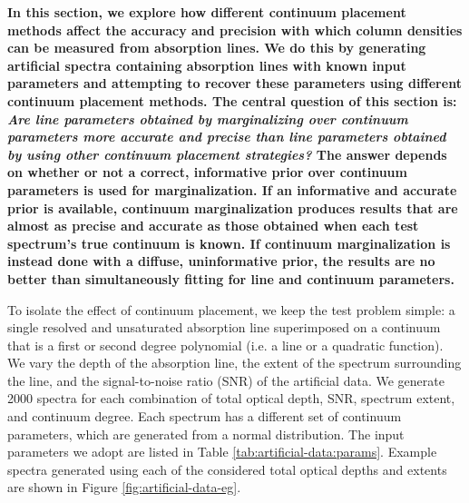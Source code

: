 \documentclass[manuscript]{aastex62}
\begin{document}
{ \bf
In this section, we explore how different continuum placement methods affect the accuracy and precision with which column densities can be measured from absorption lines.
We do this by generating artificial spectra containing absorption lines with known input parameters and attempting to recover these parameters using different continuum placement methods.
The central question of this section is: \emph{Are line parameters obtained by marginalizing over continuum parameters more accurate and precise than line parameters obtained by using other continuum placement strategies?}
The answer depends on whether or not a correct, informative prior over continuum parameters is used for marginalization.
If an informative and accurate prior is available, continuum marginalization produces results that are almost as precise and accurate as those obtained when each test spectrum's true continuum is known.
If continuum marginalization is instead done with a diffuse, uninformative prior, the results are no better than simultaneously fitting for line and continuum parameters.

To isolate the effect of continuum placement, we keep the test problem simple: a single resolved and unsaturated absorption line superimposed on a continuum that is a first or second degree polynomial (i.e. a line or a quadratic function).
We vary the depth of the absorption line, the extent of the spectrum surrounding the line, and the signal-to-noise ratio (SNR) of the artificial data.
We generate 2000 spectra for each combination of total optical depth, SNR, spectrum extent, and continuum degree.
Each spectrum has a different set of continuum parameters, which are generated from a normal distribution.
The input parameters we adopt are listed in Table \ref{tab:artificial-data:params}.
Example spectra generated using each of the considered total optical depths and extents are shown in Figure \ref{fig:artificial-data-eg}.
}
\end{document}
